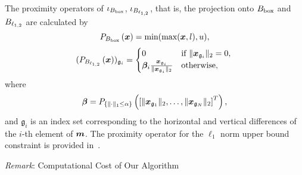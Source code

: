 The proximity operators of $\iota_{B_{\mathrm{box}}}$, $\iota_{B_{\ell_{1,2}}}$, that is, the projection onto $B_{\mathrm{box}}$ and ${B_{\ell_{1,2}}}$ are calculated by
\begin{equation} \label{eq:ProximityOperatorForBoxConstraint} \projBoxSolution, \end{equation}
\begin{equation} \label{eq:ProximityOperatorForL12Ball} \projLOneTwoBallSolution \end{equation}
where
\begin{equation} \label{eq:ProximityOperatorForL12BallWhere} \projLOneTwoBallSolutionWhere, \end{equation}
and $\mathfrak{g}_i$ is an index set corresponding to the horizontal and vertical differences of the $i$-th element of $\bm{m}$.
The proximity operator for the $\ell_1$ norm upper bound constraint is provided in~\cite{L1-ball-projection}.

\vspace{2.5mm}
\noindent \textit{Remark}: Computational Cost of Our Algorithm
\vspace{1.5mm}

